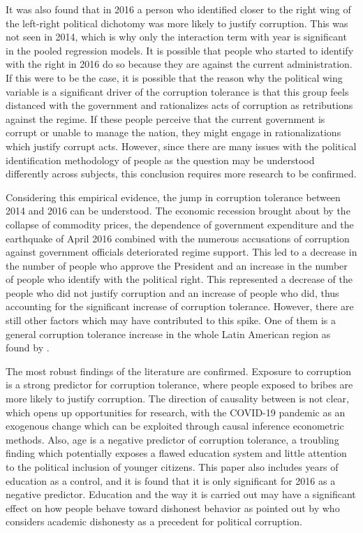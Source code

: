 \documentclass[12pt,a4]{article}\usepackage[]{graphicx}\usepackage[]{xcolor}
\begin{document}
It was also found that in 2016 a person who identified closer to the right wing of the left-right political dichotomy was more likely to justify corruption. This was not seen in 2014, which is why only the interaction term with year is significant in the pooled regression models. It is possible that people who started to identify with the right in 2016 do so because they are against the current administration. If this were to be the case, it is possible that the reason why the political wing variable is a significant driver of the corruption tolerance is that this group feels distanced with the government and rationalizes acts of corruption as retributions against the regime. If these people perceive that the current government is corrupt or unable to manage the nation, they might engage in rationalizations which justify corrupt acts. However, since there are many issues with the political identification methodology of people as the question may be understood differently across subjects, this conclusion requires more research to be confirmed. 

Considering this empirical evidence, the jump in corruption tolerance between 2014 and 2016 can be understood. The economic recession brought about by the collapse of commodity prices, the dependence of government expenditure and the earthquake of April 2016 combined with the numerous accusations of corruption against government officials deteriorated regime support. This led to a decrease in the number of people who approve the President and an increase in the number of people who identify with the political right. This represented a decrease of the people who did not justify corruption and an increase of people who did, thus accounting for the significant increase of corruption tolerance. However, there are still other factors which may have contributed to this spike. One of them is a general corruption tolerance increase in the whole Latin American region as found by \textcite{Lupu.2017}.

The most robust findings of the literature are confirmed. Exposure to corruption is a strong predictor for corruption tolerance, where people exposed to bribes are more likely to justify corruption. The direction of causality between is not clear, which opens up opportunities for research, with the COVID-19 pandemic as an exogenous change which can be exploited through causal inference econometric methods. Also, age is a negative predictor of corruption tolerance, a troubling finding which potentially exposes a flawed education system and little attention to the political inclusion of younger citizens. This paper also includes years of education as a control, and it is found that it is only significant for 2016 as a negative predictor. Education and the way it is carried out may have a significant effect on how people behave toward dishonest behavior as pointed out by \textcite{Adoum.2000} who considers academic dishonesty as a precedent for political corruption. 
\end{document}
